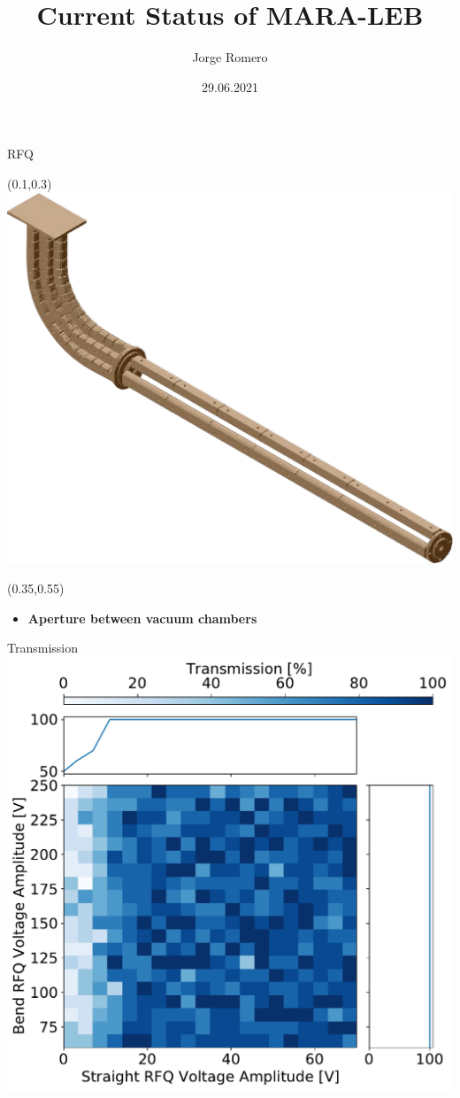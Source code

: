 \documentclass{beamer}
\title{Current Status of MARA-LEB}
\date{29.06.2021}
\author[auth]{Jorge Romero}
\begin{document}
\begin{frame}
\titlepage
\end{frame}
\begin{frame}{RFQ}
    \begin{textblock*}{0.5\textwidth}(0.1\textwidth,0.3\textheight)
    \centering
    \includegraphics[scale=0.25]{RFQ.pdf}
    \end{textblock*}
    \begin{textblock*}{0.7\textwidth}(0.35\textwidth,0.55\textheight)
        \begin{itemize}
            \item \textbf{Aperture between vacuum chambers}
        \end{itemize}
    \end{textblock*}
\end{frame}
\begin{frame}{Transmission}
    \vspace*{2em}
    \centering
    \includegraphics[scale=0.4]{gas_2cham.pdf}
\end{frame}
\end{document}
